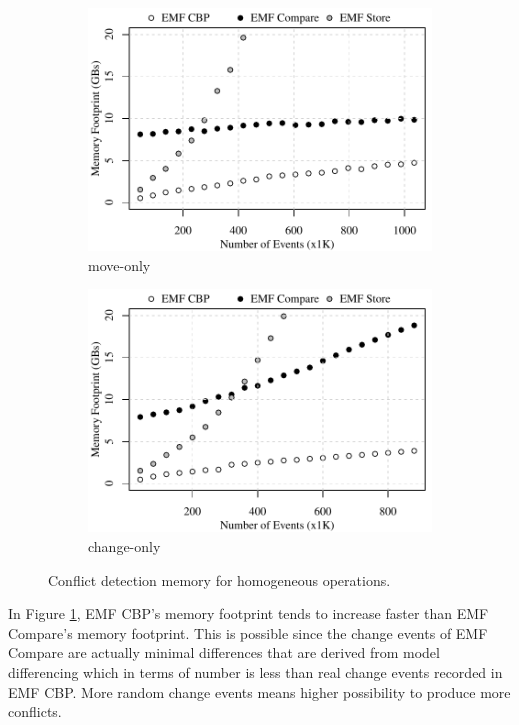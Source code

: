 \begin{figure}[ht]
\begin{subfigure}[t]{0.490\linewidth}
    \includegraphics[width=\linewidth]{move-conflict-memory-events}
    \caption{move-only}
    \label{fig:move-conflict-memory-events}
  \end{subfigure}
  \hfill
  \begin{subfigure}[t]{0.490\linewidth}
    \includegraphics[width=\linewidth]{change-conflict-memory-events}
    \caption{change-only}
    \label{fig:change-conflict-memory-events}
  \end{subfigure}
  \caption{Conflict detection memory for homogeneous operations.}
  \label{fig:homgeneous_operation_memory_events}
\end{figure}

In Figure \ref{fig:move-conflict-memory-events}, EMF CBP's memory footprint tends to increase faster than EMF Compare's memory footprint. This is possible since the change events of EMF Compare are actually minimal differences that are derived from model differencing which in terms of number is less than real change events recorded in EMF CBP. More random change events means higher possibility to produce more conflicts.


